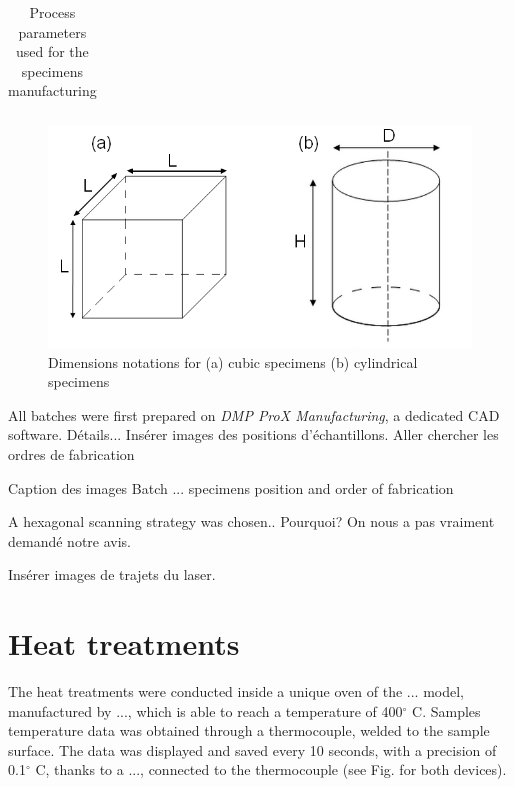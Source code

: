 \begin{table}[ht]
{\begin{tabular}{|c|c|c |c |c|c|c|}
    \hline

\end{tabular}}
\caption[Process parameters used for the specimens manufacturing]{Process parameters used for the specimens manufacturing}
\label{table:Pparam}
\end{table}
 
\begin{figure}[th]
\centering
\includegraphics[scale=0.58]{Images/cc}
\caption[Dimensions notations for (a) cubic specimens (b) cylindrical specimens]{Dimensions notations for (a) cubic specimens (b) cylindrical specimens}
\label{fig:cc}
\end{figure}

All batches were first prepared on \textit{DMP ProX Manufacturing}, a dedicated CAD software. Détails... Insérer images des positions d'échantillons. Aller chercher les ordres de fabrication

Caption des images Batch ... specimens position and order of fabrication

A hexagonal scanning strategy was chosen.. Pourquoi? On nous a pas vraiment demandé notre avis.

Insérer images de trajets du laser.

\section{Heat treatments}

The heat treatments were conducted inside a unique oven of the ... model, manufactured by ..., which is able to reach a temperature of 400$^\circ$ C. Samples temperature data was obtained through a thermocouple, welded to the sample surface. The data was displayed and saved every 10 seconds, with a precision of 0.1$^\circ$ C, thanks to a ..., connected to the thermocouple (see Fig. for both devices). \\

